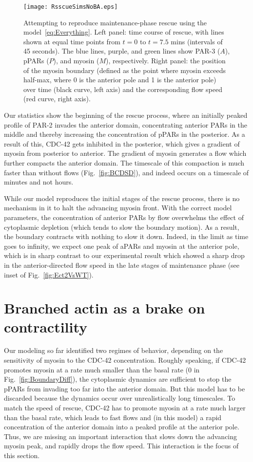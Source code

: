 \documentclass[11pt]{article}
\newcommand{\6}[1]{#1_{\text{6}}}
\newcommand{\3}[1]{#1_{\text{3}}}
\begin{document}
\begin{figure}
\centering
\texttt{[image: RsscueSimsNoBA.eps]}
\caption{\label{fig:RescueNoBA}Attempting to reproduce maintenance-phase rescue using the model\ \eqref{eq:Everything}. Left panel: time course of rescue, with lines shown at equal time points from $t=0$ to $t=7.5$ mins (intervals of 45 seconds). The blue lines, purple, and green lines show PAR-3 ($A$), pPARs ($P$), and myosin ($M$), respectively. Right panel: the position of the myosin boundary (defined as the point where myosin exceeds half-max, where 0 is the anterior pole and 1 is the anterior pole) over time (black curve, left axis) and the corresponding flow speed (red curve, right axis).  }
\end{figure}


Our statistics show the beginning of the rescue process, where an initially peaked profile of PAR-2 invades the anterior domain, concentrating anterior PARs in the middle and thereby increasing the concentration of pPARs in the posterior. As a result of this, CDC-42 gets inhibited in the posterior, which gives a gradient of myosin from posterior to anterior. The gradient of myosin generates a flow which further compacts the anterior domain. The timescale of this compaction is much faster than without flows (Fig.\ \ref{fig:BCDSD}), and indeed occurs on a timescale of minutes and not hours.

While our model reproduces the initial stages of the rescue process, there is no mechanism in it to halt the advancing myosin front. With the correct model parameters, the concentration of anterior PARs by flow overwhelms the effect of cytoplasmic depletion (which tends to slow the boundary motion). As a result, the boundary contracts with nothing to slow it down. Indeed, in the limit as time goes to infinity, we expect one peak of aPARs and myosin at the anterior pole, which is in sharp contrast to our experimental result which showed a sharp drop in the anterior-directed flow speed in the late stages of maintenance phase (see inset of Fig.\ \ref{fig:Ect2VsWT}).

\section{Branched actin as a brake on contractility }
Our modeling so far identified two regimes of behavior, depending on the sensitivity of myosin to the CDC-42 concentration. Roughly speaking, if CDC-42 promotes myosin at a rate much smaller than the basal rate (0 in Fig.\ \ref{fig:BoundaryDiff}), the cytoplasmic dynamics are sufficient to stop the pPARs from invading too far into the anterior domain. But this model has to be discarded because the dynamics occur over unrealistically long timescales. To match the speed of rescue, CDC-42 has to promote myosin at a rate much larger than the basal rate, which leads to fast flows and (in this model) a rapid concentration of the anterior domain into a peaked profile at the anterior pole. Thus, we are missing an important interaction that slows down the advancing myosin peak, and rapidly drops the flow speed. This interaction is the focus of this section.
\end{document}
